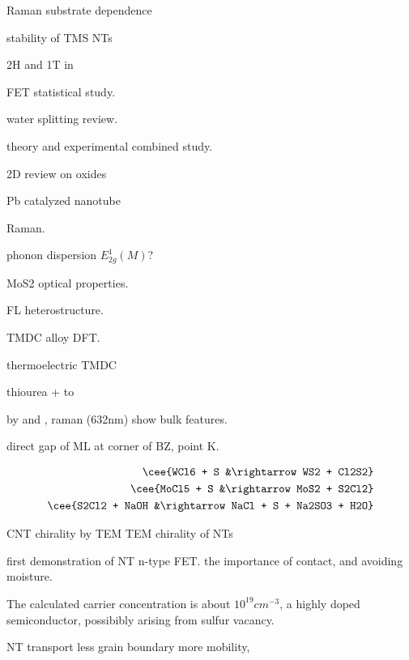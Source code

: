 Raman substrate dependence \cite{Buscema2013}

stability of TMS NTs \cite{Seifert2002}

2H and 1T in  \cite{Eda2012}

 FET statistical study. \cite{Liu2013i}

water splitting review. \cite{B800489G}

 theory and experimental combined study. \cite{Klein2001}

2D review on oxides \cite{Osada2012}

Pb catalyzed  nanotube \cite{Brontvein2012}

 Raman.\cite{Zhao2013} \cite{Sekine1980}

phonon dispersion $E_{2g}^1(M)$? \cite{Ataca2012}

MoS2 optical properties.\cite{Search1979}

FL heterostructure. \cite{Yu2013a}

\cite{Kang2013} TMDC alloy DFT.

thermoelectric TMDC \cite{Wickramaratne2014}

 thiourea +  to  \cite{Leonard-Deepak2011}

 by  and , raman (632nm) show bulk features\cite{Tenne2008}.

direct gap of ML at corner of BZ, point K.

\begin{align}
\cee{WCl6 + S &\rightarrow WS2 + Cl2S2}\\
\cee{MoCl5 + S &\rightarrow MoS2 + S2Cl2} \\
\cee{S2Cl2 + NaOH &\rightarrow NaCl + S + Na2SO3 + H2O}
\end{align}


CNT chirality by TEM \cite{Zhang1993} TEM chirality of  NTs


first demonstration of  NT n-type FET. \cite{Levi2013}
the importance of contact, and avoiding moisture. 

The calculated carrier concentration is about $10^{19}cm^{-3}$, a highly doped semiconductor, possibibly arising from sulfur vacancy. 

 NT transport \cite{Zhang2012c}
less grain boundary more mobility, 

